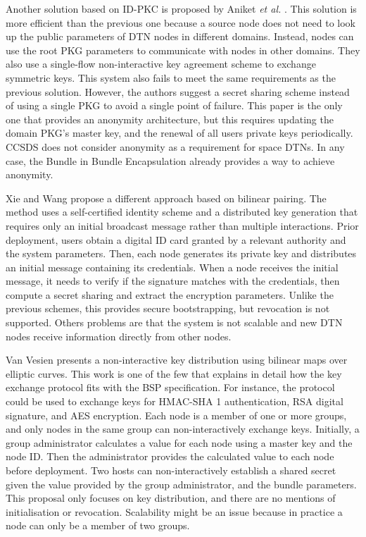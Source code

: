 Another solution based on ID-PKC is proposed by Aniket \textit{et al.} \cite{kate2007anonymity}. This solution is more efficient than the previous one because a source node does not need to look up the public parameters of DTN nodes in different domains. Instead, nodes can use the root PKG parameters to communicate with nodes in other domains. They also use a single-flow non-interactive key agreement scheme to exchange symmetric keys. This system also fails to meet the same requirements as the previous solution. However, the authors suggest a secret sharing scheme instead of using a single PKG to avoid a single point of failure. This paper is the only one that provides an anonymity architecture, but this requires updating the domain PKG's master key, and the renewal of all users private keys periodically. CCSDS \cite{book2011space} does not consider anonymity as a requirement for space DTNs. In any case, the Bundle in Bundle Encapsulation \cite{ietf-dtn-bibect-00} already provides a way to achieve anonymity. 

Xie and Wang \cite{xie2013practical} propose a different approach based on bilinear pairing. The method uses a self-certified identity scheme and a distributed key generation that requires only an initial broadcast message rather than multiple interactions. Prior deployment, users obtain a digital ID card granted by a relevant authority and the system parameters. Then, each node generates its private key and distributes an initial message containing its credentials. When a node receives the initial message, it needs to verify if the signature matches with the credentials, then compute a secret sharing and extract the encryption parameters. Unlike the previous schemes, this provides secure bootstrapping, but revocation is not supported. Others problems are that the system is not scalable and new DTN nodes receive information directly from other nodes.

Van Vesien \cite{van2010dynamic} presents a non-interactive key distribution using bilinear maps over elliptic curves. This work is one of the few that explains in detail how the key exchange protocol fits with the BSP specification. For instance,  the protocol could be used to exchange keys for HMAC-SHA 1 authentication, RSA digital signature, and AES encryption. Each node is a member of one or more groups, and only nodes in the same group can non-interactively exchange keys. Initially, a group administrator calculates a value for each node using a master key and the node ID.  Then the administrator provides the calculated value to each node before deployment. Two hosts can non-interactively establish a shared secret given the value provided by the group administrator, and the bundle parameters. This proposal only focuses on key distribution, and there are no mentions of initialisation or revocation. Scalability might be an issue because in practice a node can only be a member of two groups.


